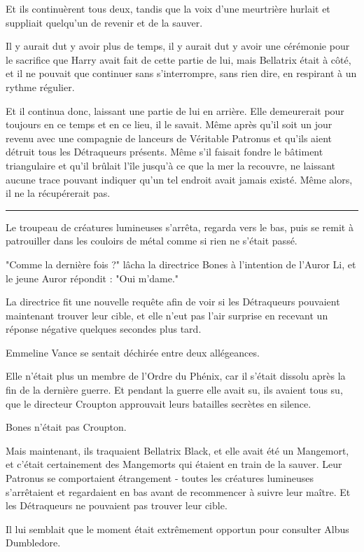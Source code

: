 Et ils continuèrent tous deux, tandis que la voix d'une meurtrière hurlait et suppliait quelqu'un de revenir et de la sauver.

Il y aurait dut y avoir plus de temps, il y aurait dut y avoir une cérémonie pour le sacrifice que Harry avait fait de cette partie de lui, mais Bellatrix était à côté, et il ne pouvait que continuer sans s'interrompre, sans rien dire, en respirant à un rythme régulier.

Et il continua donc, laissant une partie de lui en arrière. Elle demeurerait pour toujours en ce temps et en ce lieu, il le savait. Même après qu'il soit un jour revenu avec une compagnie de lanceurs de Véritable Patronus et qu'ils aient détruit tous les Détraqueurs présents. Même s'il faisait fondre le bâtiment triangulaire et qu'il brûlait l'île jusqu'à ce que la mer la recouvre, ne laissant aucune trace pouvant indiquer qu'un tel endroit avait jamais existé. Même alors, il ne la récupérerait pas.
\par\noindent\rule{\textwidth}{0.4pt}
Le troupeau de créatures lumineuses s'arrêta, regarda vers le bas, puis se remit à patrouiller dans les couloirs de métal comme si rien ne s'était passé.

"Comme la dernière fois ?" lâcha la directrice Bones à l'intention de l'Auror Li, et le jeune Auror répondit : "Oui m'dame."

La directrice fit une nouvelle requête afin de voir si les Détraqueurs pouvaient maintenant trouver leur cible, et elle n'eut pas l'air surprise en recevant un réponse négative quelques secondes plus tard.

Emmeline Vance se sentait déchirée entre deux allégeances.

Elle n'était plus un membre de l'Ordre du Phénix, car il s'était dissolu après la fin de la dernière guerre. Et pendant la guerre elle avait su, ils avaient tous su, que le directeur Croupton approuvait leurs batailles secrètes en silence.

Bones n'était pas Croupton.

Mais maintenant, ils traquaient Bellatrix Black, et elle avait été un Mangemort, et c'était certainement des Mangemorts qui étaient en train de la sauver. Leur Patronus se comportaient étrangement - toutes les créatures lumineuses s'arrêtaient et regardaient en bas avant de recommencer à suivre leur maître. Et les Détraqueurs ne pouvaient pas trouver leur cible.

Il lui semblait que le moment était extrêmement opportun pour consulter Albus Dumbledore.

